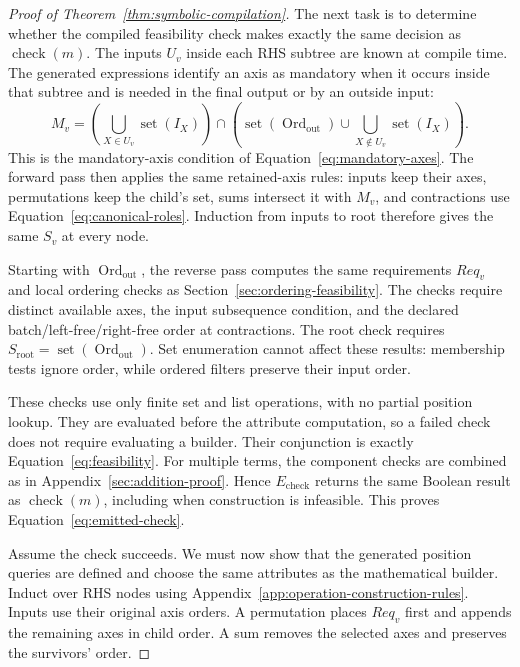 \begin{proof}[Proof of Theorem~\ref{thm:symbolic-compilation}]
The next task is to determine whether the compiled feasibility check makes exactly
the same decision as $\operatorname{check}(m)$. The inputs $U_v$ inside each
RHS subtree are known at compile time. The generated expressions identify
an axis as mandatory when it occurs inside that subtree and is needed in the final
output or by an outside input:
\begin{equation}
 M_v=\left(\bigcup_{X\in U_v}\operatorname{set}(I_X)\right)
 \cap\left(\operatorname{set}(\operatorname{Ord}_{\mathrm{out}})\cup
             \bigcup_{X\notin U_v}\operatorname{set}(I_X)\right).
 \label{eq:emitted-mandatory}
\end{equation}
This is the mandatory-axis condition of Equation~\eqref{eq:mandatory-axes}.
The forward pass then applies the same retained-axis rules: inputs keep
their axes, permutations keep the child's set, sums intersect it with
$M_v$, and contractions use Equation~\eqref{eq:canonical-roles}. Induction
from inputs to root therefore gives the same $S_v$ at every node.

Starting with $\operatorname{Ord}_{\mathrm{out}}$, the reverse pass computes the same requirements $Req_v$
and local ordering checks as Section~\ref{sec:ordering-feasibility}.
The checks require distinct available axes, the input subsequence condition,
and the declared batch/left-free/right-free order at contractions.
The root check requires $S_{\mathrm{root}}=\operatorname{set}(\operatorname{Ord}_{\mathrm{out}})$.
Set enumeration cannot affect these results: membership tests ignore order,
while ordered filters preserve their input order.

These checks use only finite set and list operations, with no partial
position lookup. They are evaluated before the attribute computation, so
a failed check does not require evaluating a builder. Their conjunction
is exactly Equation~\eqref{eq:feasibility}. For multiple terms, the component
checks are combined as in Appendix~\ref{sec:addition-proof}. Hence $E_{\mathrm{check}}$
returns the same Boolean result as $\operatorname{check}(m)$, including
when construction is infeasible. This proves Equation~\eqref{eq:emitted-check}.

Assume the check succeeds. We must now show that the generated position
queries are defined and choose the same attributes as the mathematical
builder. Induct over RHS nodes using Appendix~\ref{app:operation-construction-rules}.
Inputs use their original axis orders. A permutation places $Req_v$ first
and appends the remaining axes in child order. A sum removes the selected
axes and preserves the survivors' order.


\end{proof}
